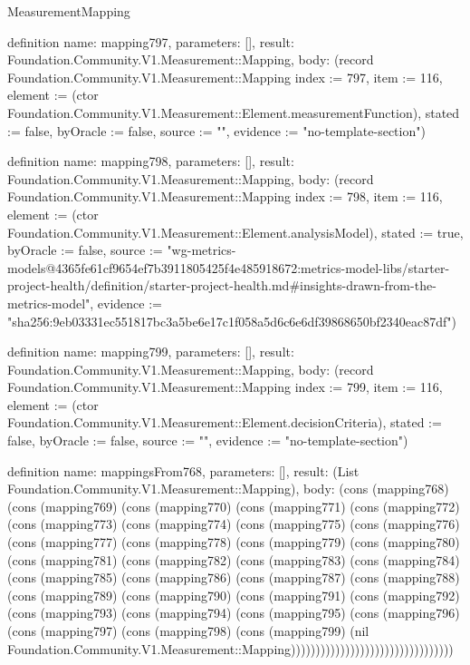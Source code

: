 \begin{lexlean}{MeasurementMapping}
\begin{semanticmodule}
definition{
  name: mapping797,
  parameters: [],
  result: Foundation.Community.V1.Measurement::Mapping,
  body: (record Foundation.Community.V1.Measurement::Mapping {index := 797, item := 116, element := (ctor Foundation.Community.V1.Measurement::Element.measurementFunction), stated := false, byOracle := false, source := "", evidence := "no-template-section"})
}

definition{
  name: mapping798,
  parameters: [],
  result: Foundation.Community.V1.Measurement::Mapping,
  body: (record Foundation.Community.V1.Measurement::Mapping {index := 798, item := 116, element := (ctor Foundation.Community.V1.Measurement::Element.analysisModel), stated := true, byOracle := false, source := "wg-metrics-models@4365fe61cf9654ef7b3911805425f4e485918672:metrics-model-libs/starter-project-health/definition/starter-project-health.md#insights-drawn-from-the-metrics-model", evidence := "sha256:9eb03331ec551817bc3a5be6e17c1f058a5d6c6e6df39868650bf2340eac87df"})
}

definition{
  name: mapping799,
  parameters: [],
  result: Foundation.Community.V1.Measurement::Mapping,
  body: (record Foundation.Community.V1.Measurement::Mapping {index := 799, item := 116, element := (ctor Foundation.Community.V1.Measurement::Element.decisionCriteria), stated := false, byOracle := false, source := "", evidence := "no-template-section"})
}

definition{
  name: mappingsFrom768,
  parameters: [],
  result: (List Foundation.Community.V1.Measurement::Mapping),
  body: (cons (mapping768) (cons (mapping769) (cons (mapping770) (cons (mapping771) (cons (mapping772) (cons (mapping773) (cons (mapping774) (cons (mapping775) (cons (mapping776) (cons (mapping777) (cons (mapping778) (cons (mapping779) (cons (mapping780) (cons (mapping781) (cons (mapping782) (cons (mapping783) (cons (mapping784) (cons (mapping785) (cons (mapping786) (cons (mapping787) (cons (mapping788) (cons (mapping789) (cons (mapping790) (cons (mapping791) (cons (mapping792) (cons (mapping793) (cons (mapping794) (cons (mapping795) (cons (mapping796) (cons (mapping797) (cons (mapping798) (cons (mapping799) (nil Foundation.Community.V1.Measurement::Mapping)))))))))))))))))))))))))))))))))
}


\end{semanticmodule}
\end{lexlean}

